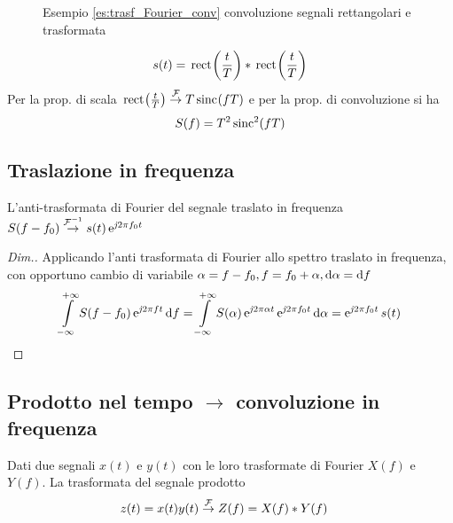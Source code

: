 \begin{esempio}\label{es:trasf_Fourier_conv}

\begin{figure}[h!]
\centering
{}\qquad
{}
\caption{Esempio \ref{es:trasf_Fourier_conv} convoluzione segnali rettangolari e trasformata}
\end{figure}

\[s(t)=\,{\operatorname{rect}}^{}\!\left({\frac{t}{T}}\right)\ast\,{\operatorname{rect}}^{}\!\left({\frac{t}{T}}\right)\]
Per la prop. di scala $\,{\operatorname{rect}}^{}\!\left({\frac{t}{T}}\right)\overset{\operatorname{\mathcal{F}}}{\to}T\,{\operatorname{sinc}}^{}\!\left({f T}\right)$ e per la prop. di convoluzione si ha
\[S(f)=T^2\operatorname{sinc}^2(f T)\]
\end{esempio}

\subsection{Traslazione in frequenza}
L'anti-trasformata di Fourier del segnale traslato in frequenza $S(f-f_0)\overset{\operatorname{\mathcal{F}}^{-1}}{\rightarrow}s(t)\operatorname{e}^{\operatorname{\mathit{j}\!} 2\pi f_0 t}$

\begin{proof}[Dim.]
Applicando l'anti trasformata di Fourier allo spettro traslato in frequenza, con opportuno cambio di variabile $\alpha=f-f_0, f=f_0+\alpha, \mathop{}\!\mathrm{d}\alpha=\mathop{}\!\mathrm{d} f$
\[\int\limits_{-\infty}^{+\infty}{S(f-f_0)\operatorname{e}^{\operatorname{\mathit{j}\!} 2\pi f t}}{\,\mathop{}\!\mathrm{d}{f}}=
\int\limits_{-\infty}^{+\infty}{S(\alpha)\operatorname{e}^{\operatorname{\mathit{j}\!} 2\pi\alpha t}\operatorname{e}^{\operatorname{\mathit{j}\!} 2\pi f_0 t}}{\,\mathop{}\!\mathrm{d}{\alpha}}=\operatorname{e}^{\operatorname{\mathit{j}\!} 2\pi f_0 t} s(t) \]
\end{proof}

\subsection{Prodotto nel tempo $\to$ convoluzione in frequenza}
Dati due segnali $x(t)$ e $y(t)$ con le loro trasformate di Fourier $X(f)$ e $Y(f)$. La trasformata del segnale prodotto
\begin{equation}
\begin{split}
z(t) = x(t) y(t) &\overset{\operatorname{\mathcal{F}}}{\rightarrow} Z(f) = X(f)\ast Y(f)
\end{split}
\end{equation}

